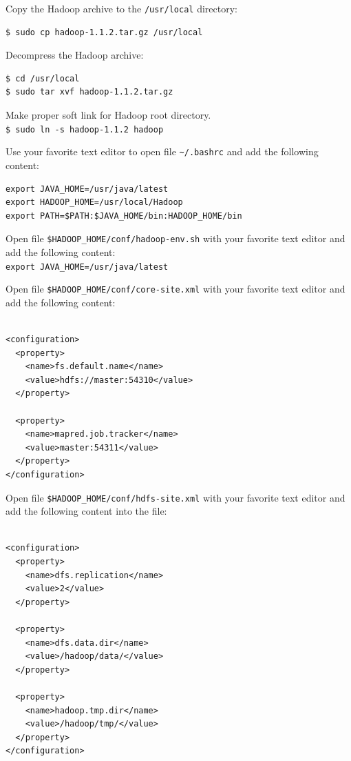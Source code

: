 Copy the Hadoop archive to the \verb|/usr/local| directory:
\lstset{style=bashstyle}
\begin{lstlisting}
$ sudo cp hadoop-1.1.2.tar.gz /usr/local
\end{lstlisting}

Decompress the Hadoop archive:
\lstset{style=bashstyle}
\begin{lstlisting}
$ cd /usr/local
$ sudo tar xvf hadoop-1.1.2.tar.gz
\end{lstlisting}

Make proper soft link for Hadoop root directory. \\
\verb|$ sudo ln -s hadoop-1.1.2 hadoop|

Use your favorite text editor to open file \verb|~/.bashrc| and add the following content:
\lstset{style=bashstyle}
\begin{lstlisting}
export JAVA_HOME=/usr/java/latest
export HADOOP_HOME=/usr/local/Hadoop
export PATH=$PATH:$JAVA_HOME/bin:HADOOP_HOME/bin
\end{lstlisting}

Open file \verb|$HADOOP_HOME/conf/hadoop-env.sh| with your favorite text editor and add the following content: \\
\verb|export JAVA_HOME=/usr/java/latest|

Open file \verb|$HADOOP_HOME/conf/core-site.xml| with your favorite text editor and add the following content:
\lstset{style=bashstyle}
\begin{lstlisting}[caption=Content to add to file core-site.xml]

<configuration>
  <property>
    <name>fs.default.name</name>
    <value>hdfs://master:54310</value>
  </property>

  <property>
    <name>mapred.job.tracker</name>
    <value>master:54311</value>
  </property>
</configuration>
\end{lstlisting}

Open file \verb|$HADOOP_HOME/conf/hdfs-site.xml| with your favorite text editor and add the following content into the file:
\lstset{style=bashstyle}
\begin{lstlisting}[caption=Content to add to file hdfs-site.xml]

<configuration>
  <property>
    <name>dfs.replication</name>
    <value>2</value>
  </property>

  <property>
    <name>dfs.data.dir</name>
    <value>/hadoop/data/</value>
  </property>

  <property>
    <name>hadoop.tmp.dir</name>
    <value>/hadoop/tmp/</value>
  </property>
</configuration>
\end{lstlisting}

